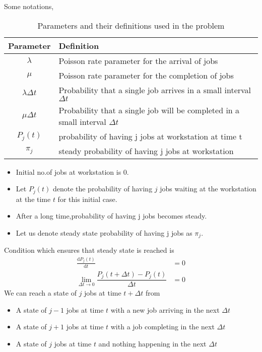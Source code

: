 \documentclass[journal,12pt,twocolumn]{IEEEtran}
\begin{document}
 Some notations,
 \begin{table}[h]
\begin{tabular}{|c|p{6cm}|}
\hline
\textbf{Parameter} & \textbf{Definition}                               \\ \hline
$\lambda$          & Poisson rate parameter for the arrival of jobs    \\ \hline
$\mu$              & Poisson rate parameter for the completion of jobs \\ \hline
$\lambda \Delta t$ & Probability that a single job arrives in a small interval $\Delta t$\\\hline 
$\mu \Delta t$ & Probability that a single job will be completed in a small interval $\Delta t$\\\hline 
$P_j(t)$             & probability of having j jobs at workstation at time t \\\hline
$\pi_j$            & steady probability of having j jobs at workstation\\\hline
\end{tabular}
\caption{Parameters and their definitions used in the problem}
\label{tab:parameters}
\end{table}
 \begin{itemize}
     \item  Initial no.of jobs at workstation is 0.
     \item Let $P_{j}(t)$ denote the probability of having $j$ jobs waiting at the workstation at the time $t$ for this initial case.
     \item After a long time,probability of having  j jobs becomes steady.
     \item Let us denote steady state probability of having j jobs as $\pi_j$.
 \end{itemize}
 Condition which ensures that steady state is reached is
 \begin{align}
     \frac{\text{d}P_j(t)}{\text{d}t}&=0\\
     \lim_{\Delta t\rightarrow 0}\dfrac{P_j(t+\Delta t)-P_j (t)}{\Delta t}&=0\label{steady-condition}
 \end{align}
  We can reach a state of $j$ jobs at time $t+\Delta t$ from
  \begin{itemize}
      \item A state of $j-1$ jobs at time $t$ with a new job arriving in the next $\Delta t$
      \item A state of $j+1$ jobs at time $t$ with a job completing in the next $\Delta t$
      \item A state of $j$ jobs at time $t$ and nothing happening in the next $\Delta t$
  \end{itemize}
\end{document}
